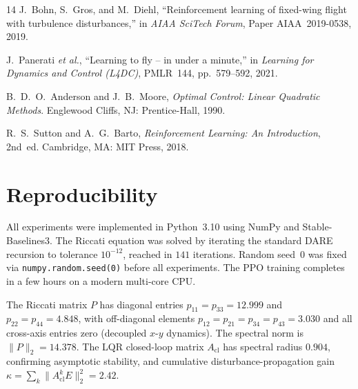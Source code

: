\documentclass[10pt, conference]{IEEEtran}
\begin{document}
\begin{thebibliography}{14}
J.~Bohn, S.~Gros, and M.~Diehl, ``Reinforcement learning of fixed-wing
flight with turbulence disturbances,'' in \textit{AIAA SciTech Forum},
Paper AIAA~2019-0538, 2019.

J.~Panerati \textit{et al.}, ``Learning to fly -- in under a minute,''
in \textit{Learning for Dynamics and Control (L4DC)}, PMLR~144,
pp.~579--592, 2021.

B.~D.~O.~Anderson and J.~B.~Moore,
\textit{Optimal Control: Linear Quadratic Methods}.
Englewood Cliffs, NJ: Prentice-Hall, 1990.

R.~S.~Sutton and A.~G.~Barto,
\textit{Reinforcement Learning: An Introduction}, 2nd~ed.
Cambridge, MA: MIT Press, 2018.

\end{thebibliography}

\appendix
\section{Reproducibility}

All experiments were implemented in Python~3.10 using NumPy and Stable-Baselines3. 
The Riccati equation was solved by iterating the standard DARE recursion to
tolerance $10^{-12}$, reached in $141$ iterations. Random seed~0 was
fixed via \texttt{numpy.random.seed(0)} before all experiments. The PPO
training completes in a few hours on a modern multi-core CPU.

The Riccati matrix $P$ has diagonal entries $p_{11} = p_{33} = 12.999$
and $p_{22} = p_{44} = 4.848$, with off-diagonal elements
$p_{12} = p_{21} = p_{34} = p_{43} = 3.030$ and all cross-axis entries
zero (decoupled $x$-$y$ dynamics). The spectral norm is $\|P\|_2 =
14.378$. The LQR closed-loop matrix $A_{\mathrm{cl}}$ has spectral
radius $0.904$, confirming asymptotic stability, and cumulative
disturbance-propagation gain $\kappa = \sum_{k} \|A_{\mathrm{cl}}^{k}E\|_2^2
= 2.42$.
\end{document}
